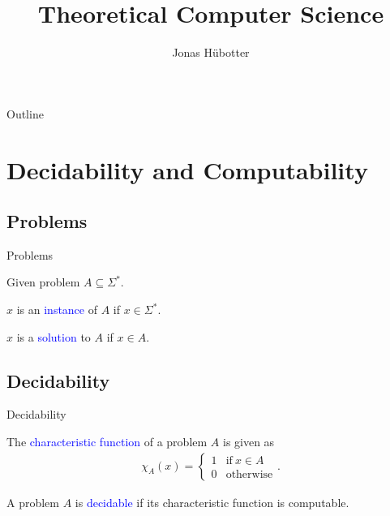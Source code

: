 \documentclass{beamer}
\title[Theoretical Computer Science]{Theoretical Computer Science}
\author{Jonas Hübotter}
\date{}
\theoremstyle{definition}
\def\spadding{\vspace{0.25cm}}
\def\b{\textcolor{blue}}
\begin{document}
\begin{frame}
  \titlepage
\end{frame}

\begin{frame}{Outline}
 \tableofcontents[subsectionstyle=hide, subsubsectionstyle=hide]
\end{frame}

\section{Decidability and Computability}

\subsection{Problems}

\begin{frame}{Problems}

Given problem $A \subseteq \Sigma^*$.\spadding

\begin{definition}
$x$ is an \b{instance} of $A$ if $x \in \Sigma^*$.\par
$x$ is a \b{solution} to $A$ if $x \in A$.
\end{definition}

\end{frame}

\subsection{Decidability}

\begin{frame}{Decidability}

\begin{definition}
The \b{characteristic function} of a problem $A$ is given as
\begin{align*}
    \chi_A(x) = \begin{cases}
                    1 & \text{if}\ x \in A \\
                    0 & \text{otherwise}
                \end{cases}.
\end{align*}
\end{definition}

\begin{definition}
A problem $A$ is \b{decidable} if its characteristic function is computable.
\end{definition}

\end{frame}
\end{document}
